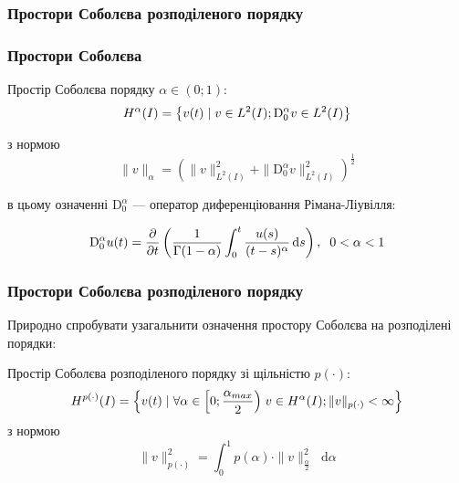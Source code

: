 \documentclass[ukrainian]{beamer}
\newcommand*\diff{\mathop{}\!\mathrm{d}}
\newcommand{\Dz}{\mathrm{D}_0}
\begin{document}
\begin{frame}
    \frametitle{Простори Соболєва розподіленого порядку}
    \tableofcontents[currentsection]
\end{frame}

\begin{frame}
    \frametitle{Простори Соболєва}

\begin{definition}
Простір Соболєва порядку $\alpha\in(0;1)$:
\begin{equation}
H^\alpha(I)=\big\{v(t)\hspace{1mm}|\hspace{1mm}v\in{L^2(I)};\Dz^\alpha{v}\in{L^2(I)}\big\}
\end{equation}

з нормою
\begin{equation}\label{deriv_sob_norm}
\|v\|_\alpha=\left(\|v\|_{L^2(I)}^2+\|\Dz^\alpha{v}\|_{L^2(I)}^2\right)^\frac{1}{2}
\end{equation}
\end{definition}

в цьому означенні $\Dz^\alpha$ --- оператор диференціювання Рімана-Ліувілля:

\begin{equation}
\Dz^\alpha{u(t)}=\frac{\partial}{\partial{t}}\left(\frac{1}{\Gamma(1-\alpha)}\int_0^t \frac{u(s)}{(t-s)^{\alpha}}\diff{s}\right),\hspace{2mm}0<\alpha<1
\end{equation}

\end{frame}

\begin{frame}
    \frametitle{Простори Соболєва розподіленого порядку}

Природно спробувати узагальнити означення простору Соболєва на розподілені порядки:

\begin{definition}
Простір Соболєва розподіленого порядку зі щільністю $p(\cdot)$:
\begin{equation}
H^{p(\cdot)}(I)=\Big\{v(t)\hspace{1mm}|\hspace{1mm}\forall{\alpha\in\left[0;\frac{\alpha_{max}}{2}\right)}\hspace{1mm}v\in{H^\alpha(I)};\|v\|_{p(\cdot)}<\infty\Big\}
\end{equation}
з нормою
\begin{equation}\label{distr_sob_norm}
\|v\|_{p(\cdot)}^2=\int_0^1p(\alpha)\cdot\|v\|_{\frac{\alpha}{2}}^2\diff{\alpha}
\end{equation}
\end{definition}
\end{frame}
\end{document}
